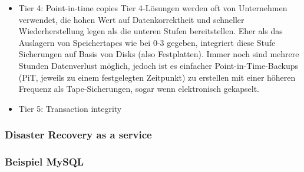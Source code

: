 \documentclass[letterpaper, 12pt]{article}
\let\tempsubsubsection\subsubsection
\renewcommand\subsubsection[1]{\vspace{0cm}\tempsubsubsection{#1}\vspace{0cm}}
\begin{document}
\begin{itemize}
	\item Tier 4: Point-in-time copies
	Tier 4-Lösungen werden oft von Unternehmen verwendet, die hohen Wert auf Datenkorrektheit und schneller Wiederherstellung legen als die unteren Stufen bereitstellen. Eher als das Auslagern von Speichertapes wie bei 0-3 gegeben, integriert diese Stufe Sicherungen auf Basis von Disks (also Festplatten). Immer noch sind mehrere Stunden Datenverlust möglich, jedoch ist es einfacher Point-in-Time-Backups (PiT, jeweils zu einem festgelegten Zeitpunkt) zu erstellen mit einer höheren Frequenz als Tape-Sicherungen, sogar wenn elektronisch gekapselt.
	\item Tier 5: Transaction integrity
\end{itemize}

\subsubsection{Disaster Recovery as a service}

\subsubsection{Beispiel MySQL}

\clearpage



\listoffigures
\end{document}
